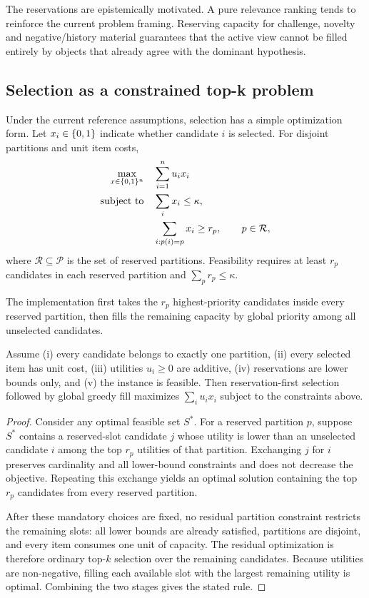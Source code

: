 The reservations are epistemically motivated. A pure relevance ranking tends to reinforce the current problem framing. Reserving capacity for challenge, novelty and negative/history material guarantees that the active view cannot be filled entirely by objects that already agree with the dominant hypothesis.

\subsection{Selection as a constrained top-k problem}

Under the current reference assumptions, selection has a simple optimization form. Let \(x_i\in\{0,1\}\) indicate whether candidate \(i\) is selected. For disjoint partitions and unit item costs,
\[
\begin{aligned}
\max_{x\in\{0,1\}^n}\quad &\sum_{i=1}^n u_i x_i\\
\text{subject to}\quad
&\sum_i x_i\le\kappa,\\
&\sum_{i:p(i)=p}x_i\ge r_p,\qquad p\in\mathcal R,
\end{aligned}
\]
where \(\mathcal R\subseteq\mathcal P\) is the set of reserved partitions. Feasibility requires at least \(r_p\) candidates in each reserved partition and \(\sum_p r_p\le\kappa\).

The implementation first takes the \(r_p\) highest-priority candidates inside every reserved partition, then fills the remaining capacity by global priority among all unselected candidates.

\begin{theorem}
Assume (i) every candidate belongs to exactly one partition, (ii) every selected item has unit cost, (iii) utilities \(u_i\ge0\) are additive, (iv) reservations are lower bounds only, and (v) the instance is feasible. Then reservation-first selection followed by global greedy fill maximizes \(\sum_i u_i x_i\) subject to the constraints above.
\end{theorem}

\begin{proof}
Consider any optimal feasible set \(S^*\). For a reserved partition \(p\), suppose \(S^*\) contains a reserved-slot candidate \(j\) whose utility is lower than an unselected candidate \(i\) among the top \(r_p\) utilities of that partition. Exchanging \(j\) for \(i\) preserves cardinality and all lower-bound constraints and does not decrease the objective. Repeating this exchange yields an optimal solution containing the top \(r_p\) candidates from every reserved partition.

After these mandatory choices are fixed, no residual partition constraint restricts the remaining slots: all lower bounds are already satisfied, partitions are disjoint, and every item consumes one unit of capacity. The residual optimization is therefore ordinary top-$k$ selection over the remaining candidates. Because utilities are non-negative, filling each available slot with the largest remaining utility is optimal. Combining the two stages gives the stated rule.
\end{proof}

